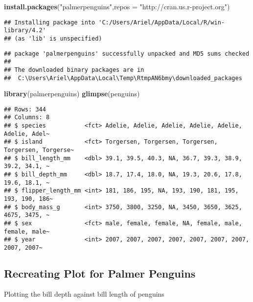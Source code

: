 \documentclass[
]{article}
\newenvironment{Shaded}{\begin{snugshade}}{\end{snugshade}}
\newcommand{\AttributeTok}[1]{\textcolor[rgb]{0.13,0.29,0.53}{#1}}
\newcommand{\FunctionTok}[1]{\textcolor[rgb]{0.13,0.29,0.53}{\textbf{#1}}}
\newcommand{\NormalTok}[1]{#1}
\newcommand{\StringTok}[1]{\textcolor[rgb]{0.31,0.60,0.02}{#1}}
\begin{document}
\begin{Shaded}
\begin{Highlighting}[]
\FunctionTok{install.packages}\NormalTok{(}\StringTok{"palmerpenguins"}\NormalTok{,}\AttributeTok{repos =} \StringTok{"http://cran.us.r{-}project.org"}\NormalTok{)}
\end{Highlighting}
\end{Shaded}

\begin{verbatim}
## Installing package into 'C:/Users/Ariel/AppData/Local/R/win-library/4.2'
## (as 'lib' is unspecified)
\end{verbatim}

\begin{verbatim}
## package 'palmerpenguins' successfully unpacked and MD5 sums checked
## 
## The downloaded binary packages are in
##  C:\Users\Ariel\AppData\Local\Temp\RtmpAN6bmy\downloaded_packages
\end{verbatim}

\begin{Shaded}
\begin{Highlighting}[]
\FunctionTok{library}\NormalTok{(palmerpenguins)}
\FunctionTok{glimpse}\NormalTok{(penguins)}
\end{Highlighting}
\end{Shaded}

\begin{verbatim}
## Rows: 344
## Columns: 8
## $ species           <fct> Adelie, Adelie, Adelie, Adelie, Adelie, Adelie, Adel~
## $ island            <fct> Torgersen, Torgersen, Torgersen, Torgersen, Torgerse~
## $ bill_length_mm    <dbl> 39.1, 39.5, 40.3, NA, 36.7, 39.3, 38.9, 39.2, 34.1, ~
## $ bill_depth_mm     <dbl> 18.7, 17.4, 18.0, NA, 19.3, 20.6, 17.8, 19.6, 18.1, ~
## $ flipper_length_mm <int> 181, 186, 195, NA, 193, 190, 181, 195, 193, 190, 186~
## $ body_mass_g       <int> 3750, 3800, 3250, NA, 3450, 3650, 3625, 4675, 3475, ~
## $ sex               <fct> male, female, female, NA, female, male, female, male~
## $ year              <int> 2007, 2007, 2007, 2007, 2007, 2007, 2007, 2007, 2007~
\end{verbatim}

\hypertarget{recreating-plot-for-palmer-penguins}{%
\subsection{Recreating Plot for Palmer
Penguins}\label{recreating-plot-for-palmer-penguins}}

Plotting the bill depth against bill length of penguins
\end{document}
